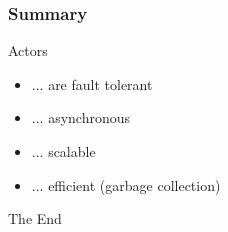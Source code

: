 \documentclass{beamer}
\begin{document}

\begin{frame}
\frametitle{Summary}
\Huge{Actors}
\Large
\begin{itemize}[<+->]
\item ... are fault tolerant
\item ... asynchronous
\item ... scalable
\item ... efficient (garbage collection)
\end{itemize}
\end{frame}


\begin{frame}
\Huge{\centerline{The End}}
\end{frame}

\end{document}
